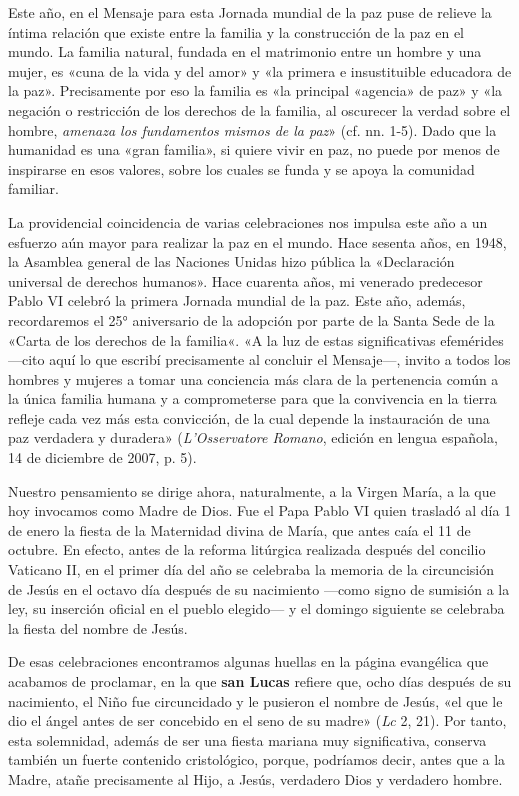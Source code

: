 \documentclass[]{article}
\begin{document}
Este año, en el Mensaje para esta Jornada mundial de la paz puse de
relieve la íntima relación que existe entre la familia y la construcción
de la paz en el mundo. La familia natural, fundada en el matrimonio
entre un hombre y una mujer, es «cuna de la vida y del amor» y «la
primera e insustituible educadora de la paz». Precisamente por eso la
familia es «la principal «agencia» de paz» y «la negación o restricción
de los derechos de la familia, al oscurecer la verdad sobre el hombre,
\emph{amenaza los fundamentos mismos de la paz}» (cf. nn. 1-5). Dado que
la humanidad es una «gran familia», si quiere vivir en paz, no puede por
menos de inspirarse en esos valores, sobre los cuales se funda y se
apoya la comunidad familiar.

La providencial coincidencia de varias celebraciones nos impulsa este
año a un esfuerzo aún mayor para realizar la paz en el mundo. Hace
sesenta años, en 1948, la Asamblea general de las Naciones Unidas hizo
pública la «Declaración universal de derechos humanos». Hace cuarenta
años, mi venerado predecesor Pablo VI celebró la primera Jornada mundial
de la paz. Este año, además, recordaremos el 25° aniversario de la
adopción por parte de la Santa Sede de la «Carta de los derechos de la
familia«. «A la luz de estas significativas efemérides ---cito aquí lo
que escribí precisamente al concluir el Mensaje---, invito a todos los
hombres y mujeres a tomar una conciencia más clara de la pertenencia
común a la única familia humana y a comprometerse para que la
convivencia en la tierra refleje cada vez más esta convicción, de la
cual depende la instauración de una paz verdadera y duradera»
(\emph{L'Osservatore Romano}, edición en lengua española, 14 de
diciembre de 2007, p. 5).

Nuestro pensamiento se dirige ahora, naturalmente, a la Virgen María, a
la que hoy invocamos como Madre de Dios. Fue el Papa Pablo VI quien
trasladó al día 1 de enero la fiesta de la Maternidad divina de María,
que antes caía el 11 de octubre. En efecto, antes de la reforma
litúrgica realizada después del concilio Vaticano II, en el primer día
del año se celebraba la memoria de la circuncisión de Jesús en el octavo
día después de su nacimiento ---como signo de sumisión a la ley, su
inserción oficial en el pueblo elegido--- y el domingo siguiente se
celebraba la fiesta del nombre de Jesús.

De esas celebraciones encontramos algunas huellas en la página
evangélica que acabamos de proclamar, en la que \textbf{san Lucas}
refiere que, ocho días después de su nacimiento, el Niño fue
circuncidado y le pusieron el nombre de Jesús, «el que le dio el ángel
antes de ser concebido en el seno de su madre» (\emph{Lc} 2, 21). Por
tanto, esta solemnidad, además de ser una fiesta mariana muy
significativa, conserva también un fuerte contenido cristológico,
porque, podríamos decir, antes que a la Madre, atañe precisamente al
Hijo, a Jesús, verdadero Dios y verdadero hombre.
\end{document}
